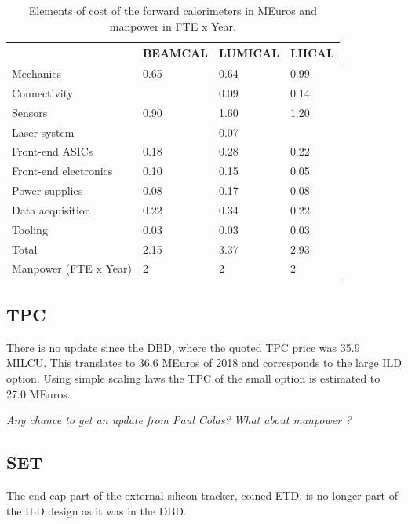 
 \begin{table}\hspace*{-0cm}\small 
\begin{tabular}[h!]{ l p{0.2\hsize}p{0.2\hsize}p{0.2\hsize} }
\toprule
& BEAMCAL & LUMICAL & LHCAL \\
\midrule
Mechanics              & 0.65   & 0.64   & 0.99   \\
Connectivity           &        & 0.09   & 0.14   \\
Sensors                & 0.90   & 1.60   & 1.20  \\
Laser system           &        & 0.07   &       \\
Front-end ASICs        & 0.18   & 0.28   & 0.22   \\
Front-end electronics  & 0.10   & 0.15   & 0.05  \\
Power supplies         & 0.08   & 0.17   & 0.08    \\
Data acquisition       & 0.22   & 0.34   & 0.22  \\
Tooling                & 0.03   & 0.03   & 0.03   \\
\midrule
Total                  & 2.15  & 3.37   & 2.93  \\
\midrule
Manpower (FTE x Year)  &2       &2       & 2 \\
\bottomrule
\end{tabular}
\caption{\label{FCals_summary}Elements of cost of the forward calorimeters in MEuros and manpower in FTE x Year.}
\end{table}

\subsection{TPC}
There is no update since the DBD, where the quoted TPC price was 35.9 MILCU. This translates to 36.6 MEuros of 2018 and corresponds to the large ILD option. Using simple scaling laws the TPC of the small option is estimated to 27.0 MEuros. 

\textit{ Any chance to get an update from Paul Colas?}
\textit{What about manpower ?}

\subsection{SET}
The end cap part of the external silicon tracker, coined ETD, is no longer part of the ILD design as it was in the DBD.

